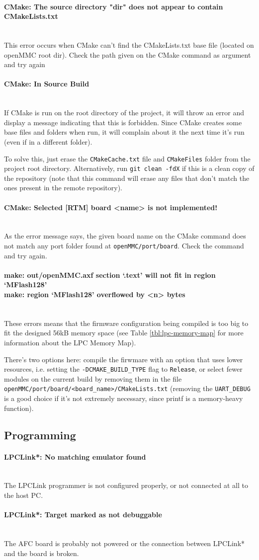\documentclass[letterpaper,12pt, titlepage]{article}
\newcommand{\newparagraph}[1]{\paragraph{#1}\mbox{}\\}
\begin{document}
\newparagraph{CMake: The source directory "dir" does not appear to contain CMakeLists.txt}
This error occurs when CMake can't find the CMakeLists.txt base file (located on openMMC root dir). Check the path given on the CMake command as argument and try again

\newparagraph{CMake: In Source Build}
If CMake is run on the root directory of the project, it will throw an error and display a message indicating that this is forbidden. Since CMake creates some base files and folders when run, it will complain about it the next time it's run (even if in a different folder).

To solve this, just erase the \texttt{CMakeCache.txt} file and \texttt{CMakeFiles} folder from the project root directory. Alternatively, run \texttt{git clean -fdX} if this is a clean copy of the repository (note that this command will erase any files that don't match the ones present in the remote repository).

\newparagraph{CMake: Selected [RTM] board <name> is not implemented!}
As the error message says, the given board name on the CMake command does not match any port folder found at \texttt{openMMC/port/board}. Check the command and try again.

\newparagraph{make: out/openMMC.axf section `.text' will not fit in region `MFlash128' \\ make: region `MFlash128' overflowed by <n> bytes}
These errors means that the firmware configuration being compiled is too big to fit the designed 56kB memory space (see Table \ref{tbl:lpc-memory-map} for more information about the LPC Memory Map).

There's two options here: compile the firwmare with an option that uses lower resources, i.e. setting the \texttt{-DCMAKE\_BUILD\_TYPE} flag to \texttt{Release}, or select fewer modules on the current build by removing them in the file \texttt{openMMC/port/board/<board\_name>/CMakeLists.txt} (removing the \texttt{UART\_DEBUG} is a good choice if it's not extremely necessary, since printf is a memory-heavy function).

\subsection{Programming}

\newparagraph{LPCLink*: No matching emulator found}
The LPCLink programmer is not configured properly, or not connected at all to the host PC.

\newparagraph{LPCLink*: Target marked as not debuggable}
The AFC board is probably not powered or the connection between LPCLink* and the board is broken.
\end{document}
